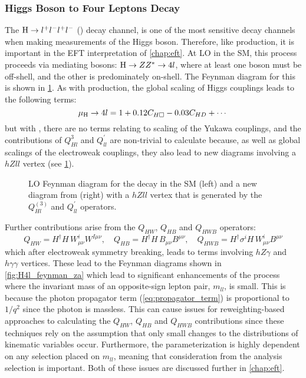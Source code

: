 \subsubsection{Higgs Boson to Four Leptons Decay}\label{sec:h4l_eft_theory}
The $\mathrm{H} \to l^+l^-l^+l^-$ (\Hfl) decay channel, is one of the most sensitive decay channels when making measurements of the Higgs boson. Therefore, like \ggH production, it is important in the EFT interpretation of \cref{chap:eft}. At LO in the SM, this process proceeds via mediating \PZ bosons: $\mathrm{H} \to ZZ^* \to 4l$, where at least one \PZ boson must be off-shell, and the other is predominately on-shell. The Feynman diagram for this is shown in \cref{fig:H4l_feynman}. As with \ggH production, the global scaling of Higgs couplings leads to the following terms:
\begin{equation}
  \mu_\mathrm{H} \to 4l = 1 + 0.12 C_{H\square} - 0.03 C_{HD} + \cdots
\end{equation}
but with \Hfl, there are no terms relating to scaling of the Yukawa couplings, and the contributions of $Q_{Hl}^3$ and $Q_{ll}^'$ are non-trivial to calculate because, as well as global scalings of the electroweak couplings, they also lead to new diagrams involving a $hZll$ vertex (see \cref{fig:H4l_feynman}). 

\begin{figure}
  \centering
  \caption[LO Feynman Diagram for the \Hfl Decay in the SM and a New Diagram from \Lsix Contributions]{LO Feynman diagram for the \Hfl decay in the SM (left) and a new diagram from \Lsix (right) with a $hZll$ vertex that is generated by the $Q_{Hl}^{(3)}$ and $Q_{ll}^'$ operators.}\label{fig:H4l_feynman}
\end{figure}

Further contributions arise from the $Q_{HW}$, $Q_{HB}$ and $Q_{HWB}$ operators:
\begin{equation}
  Q_{HW} = H^\dag H\, W^i_{\mu\nu} W^{I\mu\nu}, \quad Q_{HB} = H^\dag H\, B_{\mu\nu} B^{\mu\nu}, \quad Q_{HWB} = H^\dag \sigma^i H\, W^i_{\mu\nu} B^{\mu\nu}
\end{equation}
which after electroweak symmetry breaking, leads to terms involving $hZ\gamma$ and $h\gamma\gamma$ vertices. These lead to the Feynman diagrams shown in \cref{fig:H4l_feynman_za} which lead to significant enhancements of the \Hfl process where the invariant mass of an opposite-sign lepton pair, $m_{ll}$, is small. This is because the photon propagator term (\cref{eq:propagator_term}) is proportional to $1/q^2$ since the photon is massless. This can cause issues for reweighting-based approaches to calculating the $Q_{HW}$, $Q_{HB}$ and $Q_{HWB}$ contributions since these techniques rely on the assumption that only small changes to the distributions of kinematic variables occur. Furthermore, the parameterization is highly dependent on any selection placed on $m_{ll}$, meaning that consideration from the analysis selection is important. Both of these issues are discussed further in \cref{chap:eft}.

